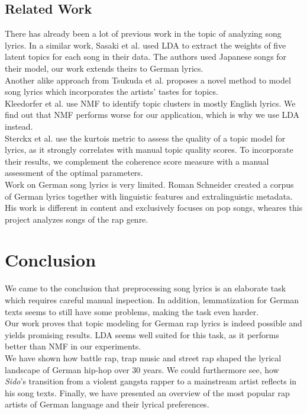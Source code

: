 \documentclass[conference]{IEEEtran}
\begin{document}
\subsection{Related Work}
There has already been a lot of previous work in the topic of analyzing song lyrics. In a similar work, Sasaki et al. \cite{sasaki} used LDA to extract the weights of five latent topics for each song in their data. The authors used Japanese songs for their model, our work extends theirs to German lyrics.\\
Another alike approach from Tsukuda et al. \cite{tsukuda} proposes a novel method to model song lyrics which incorporates the artists' tastes for topics.\\
Kleedorfer et al. \cite{kleedorfer} use NMF to identify topic clusters in mostly English lyrics. We find out that NMF performs worse for our application, which is why we use LDA instead.\\
Sterckx et al. \cite{sterckx} use the kurtois metric to assess the quality of a topic model for lyrics, as it strongly correlates with manual topic quality scores. To incorporate their results, we complement the coherence score measure with a manual assessment of the optimal parameters.\\
Work on German song lyrics is very limited. Roman Schneider \cite{schneider} created a corpus of German lyrics together with linguistic features and extralinguistic metadata. His work is different in content and exclusively focuses on pop songs, wheares this project analyzes songs of the rap genre.

\section{Conclusion}
We came to the conclusion that preprocessing song lyrics is an elaborate task which requires careful manual inspection. In addition, lemmatization for German texts seems to still have some problems, making the task even harder.\\
Our work proves that topic modeling for German rap lyrics is indeed possible and yields promising results. LDA seems well suited for this task, as it performs better than NMF in our experiments.\\
We have shown how battle rap, trap music and street rap shaped the lyrical landscape of German hip-hop over 30 years. We could furthermore see, how \textit{Sido}'s transition from a violent gangsta rapper to a mainstream artist reflects in his song texts. Finally, we have presented an overview of the most popular rap artists of German language and their lyrical preferences.

{
\balance{
  
  
  }
}
\end{document}
